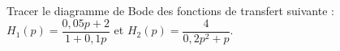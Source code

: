 

\setcounter{exo}{0}

Tracer le diagramme de Bode des fonctions de transfert suivante : $H_1(p)=\dfrac{0,05p+2}{1+0,1p}$ et $H_2(p)=\dfrac{4}{0,2p^2+p}$.

